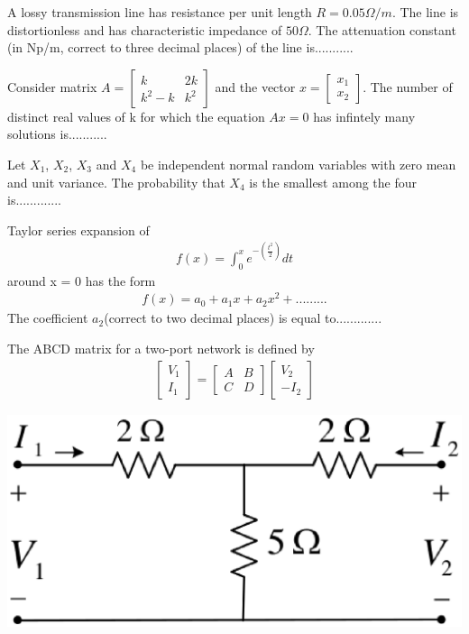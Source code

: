 \item A lossy transmission line has resistance per unit length $R = 0.05\Omega/m$. The line is distortionless and has characteristic impedance of $50\Omega$. The attenuation constant (in Np/m, correct to three decimal places) of the line is...........

\item Consider matrix 
$A = \begin{bmatrix}
k & 2k \\ k^2 - k & k^2
\end{bmatrix}$ 
and the vector
$x = \begin{bmatrix}
 x_1 \\ x_2
\end{bmatrix}$. 
The number of distinct real values of k for which the equation $Ax = 0$ has infintely many solutions is...........

\item Let $X_1$, $X_2$, $X_3$ and $X_4$ be independent normal random variables with zero mean and unit variance. The probability that $X_4$ is the smallest among the four is.............

\item Taylor series expansion of 
\begin{align*}
f(x) = \int_{0}^{x}e^{-\left(\frac{t^2}{2}\right)}dt
\end{align*}
around x = 0 has the form
\begin{align*}
f(x) = a_0 + a_1x + a_2x^2 +.........
\end{align*}
The coefficient $a_2$(correct to two decimal places) is equal to.............

\item The ABCD matrix for a two-port network is defined by
\begin{align*}
\begin{bmatrix}
V_1 \\ I_1
\end{bmatrix}
=
\begin{bmatrix}
A & B \\ C & D
\end{bmatrix}
\begin{bmatrix}
V_2 \\ -I_2
\end{bmatrix}
\end{align*}

\includegraphics[scale=0.3]{35}

